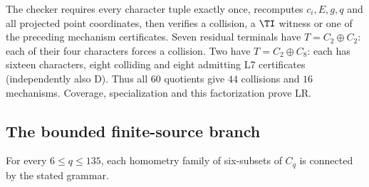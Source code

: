 The checker requires every character tuple exactly once, recomputes
$c_i,E,g,q$ and all projected point coordinates, then verifies a collision,
a $\TI$ witness or one of the preceding mechanism certificates.
Seven residual terminals have $T=C_2\oplus C_2$: each of their four
characters forces a collision. Two have $T=C_2\oplus C_8$: each has
sixteen characters, eight colliding and eight admitting L7 certificates
(independently also D). Thus all $60$ quotients give $44$ collisions and
$16$ mechanisms. Coverage, specialization and this factorization prove LR.

\subsection{The bounded finite-source branch}
\begin{lemma}[FT]\label{lem:ft}
For every $6\le q\le135$, each homometry family of six-subsets of
$C_q$ is connected by the stated grammar.
\end{lemma}
